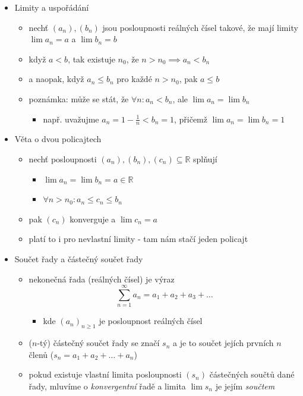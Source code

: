 \begin{itemize}
\begin{itemize}
\begin{itemize}
\item tzn. limita $(a_n)$ nemusí existovat
\end{itemize}
\end{itemize}
\item Limity a uspořádání
\begin{itemize}
\item nechť $(a_n),(b_n)$ jsou posloupnosti reálných čísel takové, že mají limity $\lim a_n=a$ a $\lim b_n=b$
\item když $a\lt b$, tak existuje $n_0$, že $n\gt n_0\implies a_n\lt b_n$
\item a naopak, když $a_n\leq b_n$ pro každé $n\gt n_0$, pak $a\leq b$
\item poznámka: může se stát, že $\forall n:a_n\lt b_n$, ale $\lim a_n=\lim b_n$
\begin{itemize}
\item např. uvažujme $a_n=1-\frac1n\lt b_n=1$, přičemž $\lim a_n=\lim b_n=1$
\end{itemize}
\end{itemize}
\item Věta o dvou policajtech
\begin{itemize}
\item nechť posloupnosti $(a_n),(b_n),(c_n)\subseteq\mathbb R$ splňují
\begin{itemize}
\item $\lim a_n=\lim b_n=a\in\mathbb R$
\item $\forall n\gt n_0:a_n\leq c_n\leq b_n$
\end{itemize}
\item pak $(c_n)$ konverguje a $\lim c_n=a$
\item platí to i pro nevlastní limity - tam nám stačí jeden policajt
\end{itemize}
\item Součet řady a částečný součet řady
\begin{itemize}
\item nekonečná řada (reálných čísel) je výraz \[\sum_{n=1}^\infty a_n=a_1+a_2+a_3+\dots\]
\begin{itemize}
\item kde $(a_n)_{n\geq 1}$ je posloupnost reálných čísel
\end{itemize}
\item ($n$-tý) částečný součet řady se značí $s_n$ a je to součet jejích prvních $n$ členů ($s_n=a_1+a_2+\dots+a_n$)
\item pokud existuje vlastní limita posloupnosti $(s_n)$ částečných součtů dané řady, mluvíme o \textit{konvergentní} řadě a limita $\lim s_n$ je jejím \textit{součtem}

\end{itemize}
\end{itemize}

